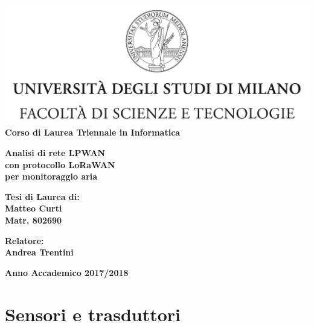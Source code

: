\documentclass[a4paper]{report} %
\begin{document}
\hypersetup{pageanchor=false}
\begin{titlepage}
\begin{center}
\includegraphics[width=\textwidth]{Logo.jpg}\\
{\large{\bf Corso di Laurea Triennale in Informatica}}
\end{center}
\vspace{12mm}
\begin{center}
{\huge{\bf Analisi di rete LPWAN}}\\
\vspace{4mm}
{\huge{\bf con protocollo LoRaWAN}}\\
\vspace{4mm}
{\huge{\bf per monitoraggio aria}}\\
\end{center}
\vspace{12mm}
\begin{flushright}
{\large{\bf Tesi di Laurea di:}}\\
{\large{\bf Matteo Curti}}\\
{\large{\bf Matr. 802690}}\\
\end{flushright}
\vspace{4mm}
\begin{flushleft}
{\large{\bf Relatore:}}\\
{\large{\bf Andrea Trentini}}\\
\vspace{4mm}
\end{flushleft}
\vspace{12mm}
\begin{center}
{\large{\bf Anno Accademico 2017/2018}}
\end{center}
\end{titlepage}
\tableofcontents
\listoffigures
\listoftables
\chapter{Sensori e trasduttori}
\end{document}
